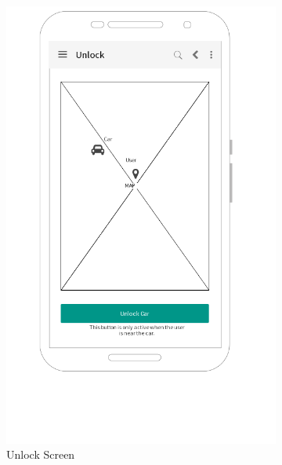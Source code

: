 \documentclass[12pt]{article}
\begin{document}
\begin{figure}[h!]
    \centering
    \hspace{-2cm}
    \begin{subfigure}[b]{0.45\textwidth}
        \includegraphics[width=\textwidth]{../UI/UnlockScreen}
        \caption{Unlock Screen}
    \end{subfigure}
    ~
    \begin{subfigure}[b]{0.64\textwidth}

\end{subfigure}
\end{figure}
\end{document}

